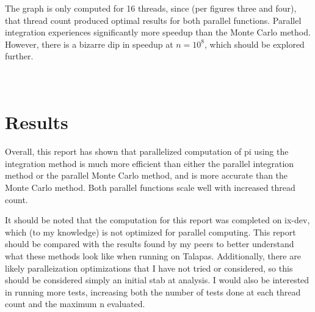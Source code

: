 \documentclass[a4paper]{article}
\begin{document}
The graph is only computed for 16 threads, since (per figures three and four), that thread count produced optimal results for both parallel functions. Parallel integration experiences significantly more speedup than the Monte Carlo method. However, there is a bizarre dip in speedup at $n = 10^8$, which should be explored further. 
\\\\\\
\section{Results}
Overall, this report has shown that parallelized computation of pi using the integration method is much more efficient than either the parallel integration method or the parallel Monte Carlo method, and is more accurate than the Monte Carlo method. Both parallel functions scale well with increased thread count.

It should be noted that the computation for this report was completed on ix-dev, which (to my knowledge) is not optimized for parallel computing. This report should be compared with the results found by my peers to better understand what these methods look like when running on Talapas. Additionally, there are likely paralleization optimizations that I have not tried or considered, so this should be considered simply an initial stab at analysis. I would also be interested in running more tests, increasing both the number of tests done at each thread count and the maximum n evaluated. 
\end{document}
